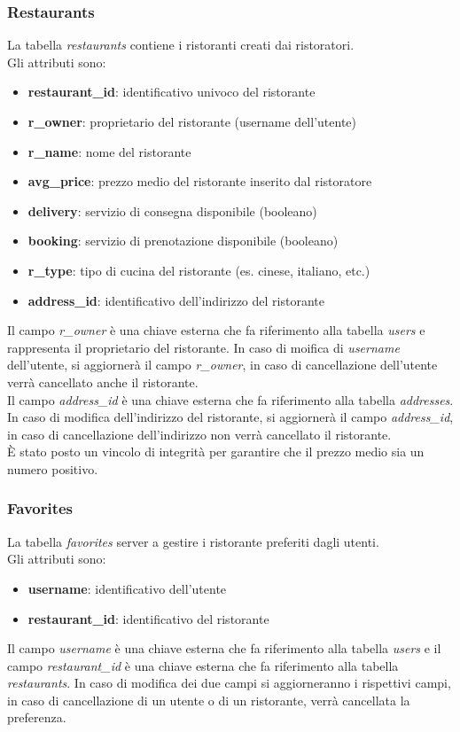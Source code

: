 \subsubsection{Restaurants}
\label{sec:restaurants}
La tabella \textit{restaurants} contiene i ristoranti creati 
dai ristoratori.\\
Gli attributi sono:
\begin{itemize}
    \item \textbf{restaurant\_id}: identificativo univoco del ristorante
    \item \textbf{r\_owner}: proprietario del ristorante (username dell'utente)
    \item \textbf{r\_name}: nome del ristorante
    \item \textbf{avg\_price}: prezzo medio del ristorante inserito dal ristoratore
    \item \textbf{delivery}: servizio di consegna disponibile (booleano)
    \item \textbf{booking}: servizio di prenotazione disponibile (booleano)
    \item \textbf{r\_type}: tipo di cucina del ristorante (es. cinese, italiano, etc.)
    \item \textbf{address\_id}: identificativo dell'indirizzo del ristorante
\end{itemize}
Il campo \textit{r\_owner} è una chiave esterna che fa riferimento
alla tabella \textit{users} e rappresenta il proprietario del ristorante.
In caso di moifica di \textit{username} dell'utente, si aggiornerà
il campo \textit{r\_owner}, in caso di cancellazione dell'utente 
verrà cancellato anche il ristorante.\\
Il campo \textit{address\_id} è una chiave esterna che fa riferimento
alla tabella \textit{addresses}.
In caso di modifica dell'indirizzo del ristorante, si aggiornerà
il campo \textit{address\_id}, in caso di cancellazione dell'indirizzo
non verrà cancellato il ristorante.\\
\`E stato posto un vincolo di integrità per garantire che il
prezzo medio sia un numero positivo.

\subsubsection{Favorites}
\label{sec:favorites}
La tabella \textit{favorites} server a gestire i 
ristorante preferiti dagli utenti.\\
Gli attributi sono:
\begin{itemize}
    \item \textbf{username}: identificativo dell'utente
    \item \textbf{restaurant\_id}: identificativo del ristorante
\end{itemize}
Il campo \textit{username} è una chiave esterna che fa riferimento
alla tabella \textit{users} e il campo \textit{restaurant\_id} 
è una chiave esterna che fa riferimento
alla tabella \textit{restaurants}. In caso di modifica dei due campi
si aggiorneranno i rispettivi campi, in caso di cancellazione
di un utente o di un ristorante, verrà cancellata la preferenza.

